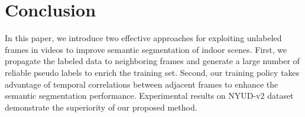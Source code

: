 \section{Conclusion}
\label{sec:conclusion}
In this paper, we introduce two effective approaches for exploiting unlabeled frames in videos to improve semantic segmentation of indoor scenes. 
First, we propagate the labeled data to neighboring frames and generate a large number of reliable pseudo labels to enrich the training set.
%
Second, our training policy takes advantage of temporal correlations between adjacent frames to enhance the semantic segmentation performance.
%
Experimental results on NYUD-v2 dataset demonstrate the superiority of our proposed method.  
%
%


